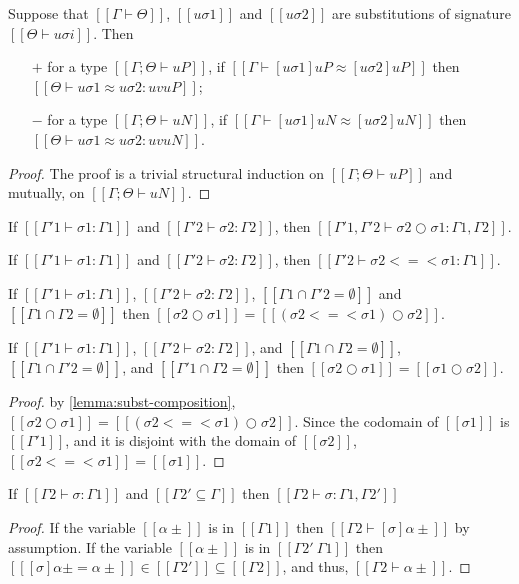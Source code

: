 \begin{lemma}
  \label{lemma:subst-equiv-metavar}
  Suppose that $[[Γ ⊢ Θ]]$, $[[uσ1]]$ and $[[uσ2]]$ are substitutions 
  of signature $[[Θ ⊢ uσi]]$.
  Then 
  \begin{enumerate}
    \item [$+$] for a type $[[Γ; Θ ⊢ uP]]$, if $[[Γ ⊢ [uσ1]uP ≈ [uσ2]uP]]$ then
      $[[Θ ⊢ uσ1 ≈ uσ2 : uv uP]]$;
    \item [$-$] for a type $[[Γ; Θ ⊢ uN]]$, if $[[Γ ⊢ [uσ1]uN ≈ [uσ2]uN]]$ then
      $[[Θ ⊢ uσ1 ≈ uσ2 : uv uN]]$.
  \end{enumerate}
\end{lemma}
\begin{proof}
  The proof is a trivial structural induction on 
  $[[Γ; Θ ⊢ uP]]$ and mutually, on $[[Γ; Θ ⊢ uN]]$.
\end{proof}


\begin{lemma}
  If $[[Γ'1 ⊢ σ1 : Γ1]]$ and $[[Γ'2 ⊢ σ2 : Γ2]]$,
  then $[[Γ'1, Γ'2 ⊢ σ2 ○ σ1 : Γ1, Γ2]]$.
\end{lemma}

\begin{lemma}
  \label{lemma:subst-monad-composition-wf}
  If $[[Γ'1 ⊢ σ1 : Γ1]]$ and $[[Γ'2 ⊢ σ2 : Γ2]]$,
  then $[[Γ'2 ⊢ σ2 <=< σ1 : Γ1]]$.
\end{lemma}

\begin{lemma}
  \label{lemma:subst-composition}
    If $[[Γ'1 ⊢ σ1 : Γ1]]$, $[[Γ'2 ⊢ σ2 : Γ2]]$, 
    $[[{Γ1} ∩ {Γ'2} = ∅ ]]$ and $[[ {Γ1} ∩ {Γ2} = ∅ ]]$ then 
    $[[ σ2 ○ σ1 ]] = [[ (σ2 <=< σ1) ○ σ2 ]]$.
\end{lemma}

\begin{corollary}
  \label{corollary:subst-composition-commutativity}
  If $[[Γ'1 ⊢ σ1 : Γ1]]$, $[[Γ'2 ⊢ σ2 : Γ2]]$, and
  $[[ {Γ1} ∩ {Γ2} = ∅ ]]$, 
  $[[ {Γ1} ∩ {Γ'2} = ∅ ]]$, and
  $[[ {Γ'1} ∩ {Γ2} = ∅ ]]$ then 
  $[[ σ2 ○ σ1 ]] = [[ σ1 ○ σ2 ]]$.
\end{corollary}
\begin{proof}
  by \cref{lemma:subst-composition},
    $[[ σ2 ○ σ1 ]] = [[ (σ2 <=< σ1) ○ σ2 ]]$.
    Since the codomain of $[[σ1]]$ is $[[Γ'1]]$,
    and it is disjoint with the domain of $[[σ2]]$,
    $[[σ2 <=< σ1]] = [[σ1]]$.
\end{proof}

\begin{lemma}
  \label{lemma:subst-domain-weakening}
  If $[[Γ2 ⊢ σ : Γ1]]$ and $[[ {Γ2'} ⊆ {Γ} ]]$ then $[[Γ2 ⊢ σ : Γ1, Γ2']]$
\end{lemma}
\begin{proof}
  If the variable $[[α±]]$ is in $[[Γ1]]$ then $[[Γ2 ⊢ [σ]α± ]]$ by assumption.
  If the variable $[[α±]]$ is in $[[{Γ2'} \ {Γ1}]]$ then $[[ [σ]α± = α± ]] \in [[Γ2']] ⊆ [[Γ2]]$, 
  and thus, $[[Γ2 ⊢ α± ]]$.
\end{proof}
